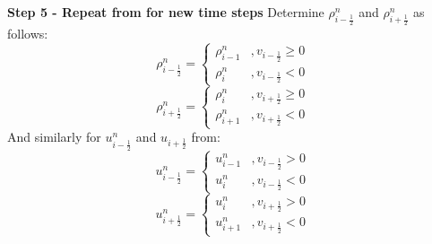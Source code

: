 \documentclass[11pt,letterpaper,titlepage]{article}
\newcommand{\half}{\frac{1}{2}}
\begin{document}
\vspace{0.5cm}\noindent
\textbf{Step 5 - Repeat from for new time steps}\newline
Determine $\rho_{i-\half}^n$ and $\rho_{i+\half}^n$ as follows:
\begin{equation*}
\rho_{i-\half}^n=
\begin{cases}
\rho_{i-1}^n     &,v_{i-\half}\ge 0 \\
\rho_{i}^n    &,v_{i-\half}<0
\end{cases}
\end{equation*}
\begin{equation*}
\rho_{i+\half}^n=
\begin{cases}
\rho_{i}^n     &,v_{i+\half}\ge 0 \\
\rho_{i+1}^n    &,v_{i+\half}<0
\end{cases}
\end{equation*}
And similarly for $u_{i-\half}^n$ and $u_{i+\half}$ from:
\begin{equation*}
u_{i-\half}^n=
\begin{cases}
u_{i-1}^n     &,v_{i-\half}>0 \\
u_{i}^n    &,v_{i-\half}<0
\end{cases}
\end{equation*}
\begin{equation*}
u_{i+\half}^n=
\begin{cases}
u_{i}^n     &,v_{i+\half}>0 \\
u_{i+1}^n    &,v_{i+\half}<0
\end{cases}
\end{equation*}
\end{document}
